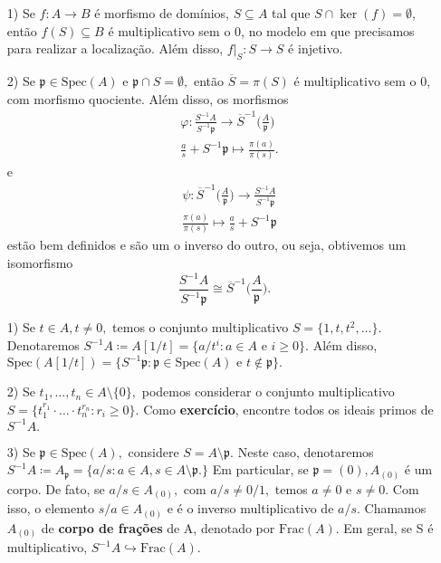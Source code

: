 \documentclass[algebraII_notes.tex]{subfiles}
\begin{document}
\begin{prop*}[Exercício]
	\begin{itemize}
		\item[1)] Se \(f:A\rightarrow B\) é morfismo de domínios, \(S\subseteq A\) tal que \(S\cap\ker{(f)} = \emptyset\), então
		      \(f(S)\subseteq B\) é multiplicativo sem o 0, no modelo em que precisamos para realizar a localização. Além disso, \(f|_S:S\rightarrow S\)
		      é injetivo.
		\item[2)] Se \(\mathfrak{p}\in \mathrm{Spec}(A)\) e \(\mathfrak{p}\cap S = \emptyset,\) então \(\overline{S} = \pi (S)\) é multiplicativo sem o 0, com
		      morfismo quociente. Além disso, os morfismos
		      \begin{align*}
			       & \varphi :\frac{S^{-1}A}{S^{-1}\mathfrak{p}}\rightarrow \overline{S}^{-1}\biggl(\frac{A}{\mathfrak{p}}\biggr) \\
			       & \frac{a}{s}+S^{-1}\mathfrak{p}\mapsto \frac{\pi (a)}{\pi (s)}.
		      \end{align*}
		      e
		      \begin{align*}
			       & \psi:\overline{S}^{-1}\biggl(\frac{A}{\mathfrak{p}}\biggr)\rightarrow \frac{S^{-1}A}{S^{-1}\mathfrak{p}} \\
			       & \frac{\pi (a)}{\pi (s)}\mapsto \frac{a}{s} + S^{-1}\mathfrak{p}
		      \end{align*}
		      estão bem definidos e são um o inverso do outro, ou seja, obtivemos um isomorfismo
		      \[
			      \frac{S^{-1}A}{S^{-1}\mathfrak{p}}\cong{\overline{S}^{-1}\biggl(\frac{A}{\mathfrak{p}}\biggr)}.
		      \]
	\end{itemize}
\end{prop*}
\begin{example}
	\begin{itemize}
		\item[1)] Se \(t\in A, t\neq0,\) temos o conjunto multiplicativo \(S=\{1, t, t^{2}, \dotsc\}\).
		      Denotaremos \(S^{-1}A\coloneqq A[1/t] = \{a/t^{i}: a\in A \text{ e } i\geq 0\}\). Além disso,
		      \(\mathrm{Spec}(A[1/t]) = \{S^{-1}\mathfrak{p}:\mathfrak{p}\in \mathrm{Spec}(A) \text{ e }t\not\in \mathfrak{p}\}.\)
		\item[2)] Se \(t_{1}, \dotsc, t_{n}\in A\setminus{\{0\}},\) podemos considerar o conjunto multiplicativo \(S = \{t_{1}^{r_{1}}\cdot \dotsc \cdot t_{n}^{r_{n}}: r_{i}\geq 0\}.\)
		      Como \textbf{exercício}, encontre todos os ideais primos de \(S^{-1}A.\)
		\item[3)] Se \(\mathfrak{p}\in \mathrm{Spec}(A),\) considere \(S = A\setminus{\mathfrak{p}}.\) Neste caso, denotaremos
		      \(S^{-1}A\coloneqq A_{\mathfrak{p}} = \{a/s: a\in A, s\in A\setminus{\mathfrak{p}}.\}\) Em particular, se \(\mathfrak{p}=(0), A_{(0)}\)
		      é um corpo. De fato, se \(a/s\in A_{(0)},\) com \(a/s\neq0/1,\) temos \(a\neq0\) e \(s\neq0.\) Com isso, o elemento
		      \(s/a\in A_{(0)}\) e é o inverso multiplicativo de \(a/s\). Chamamos \(A_{(0)}\) de \textbf{corpo de frações} de A,
		      denotado por \(\mathrm{Frac}(A).\) Em geral, se S é multiplicativo, \(S^{-1}A\hookrightarrow \mathrm{Frac}(A).\)
	\end{itemize}
\end{example}
\end{document}
